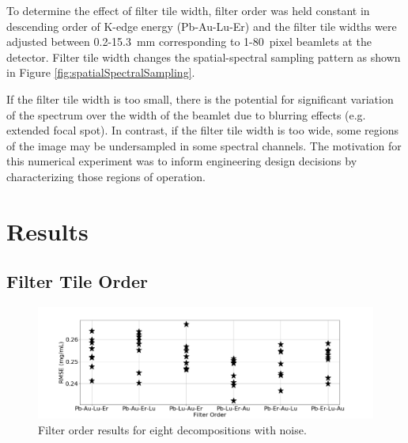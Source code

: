 \documentclass[12pt]{spieman}  %
\begin{document}
\begin{spacing}{1}
\vspace{-2mm}

To determine the effect of filter tile width, filter order was held constant in descending order of K-edge energy (Pb-Au-Lu-Er) and the filter tile widths were adjusted between 0.2-15.3~mm corresponding to 1-80~pixel beamlets at the detector. Filter tile width changes the spatial-spectral sampling pattern as shown in Figure \ref{fig:spatialSpectralSampling}. 

If the filter tile width is too small, there is the potential for significant variation of the spectrum over the width of the beamlet due to blurring effects (e.g. extended focal spot). In  contrast, if the filter tile width is too wide, some regions of the image may be undersampled in some spectral channels. The motivation for this numerical experiment was to inform engineering design decisions by characterizing those regions of operation.

\vspace{-2mm}

\section{Results}

\vspace{-2mm}

\subsection{Filter Tile Order}

\vspace{-1mm}

\begin{figure}    
    \vspace{-16mm}
    \centering
    \includegraphics[clip,trim={2.0cm 0.0cm 4.0cm 1.8cm}, scale = 0.26]{figures/filterOrderPlot.png}
    \caption{Filter order results for eight decompositions with noise.}
    \label{fig:filterOrderPlot} 
\end{figure}


\end{spacing}
\end{document}
